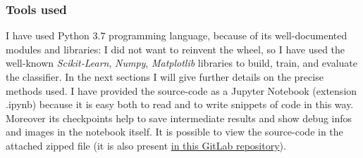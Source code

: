 \documentclass[12pt]{article}
\begin{document}
\subsubsection{Tools used}
I have used Python 3.7 programming language, because of its well-documented modules and libraries: I did not want to reinvent the wheel, so I have used the well-known \textit{Scikit-Learn}, \textit{Numpy}, \textit{Matplotlib} libraries to build, train, and evaluate the classifier. In the next sections I will give further details on the precise methods used.
I have provided the source-code as a Jupyter Notebook (extension .ipynb) because it is easy both to read and to write snippets of code in this way. Moreover its checkpoints help to save intermediate results and show debug infos and images in the notebook itself. It is possible to view the source-code in the attached zipped file (it is also present \href{https://www.gitlab.com/lrusso96/machine-learning}{in this GitLab repository}).
\end{document}
